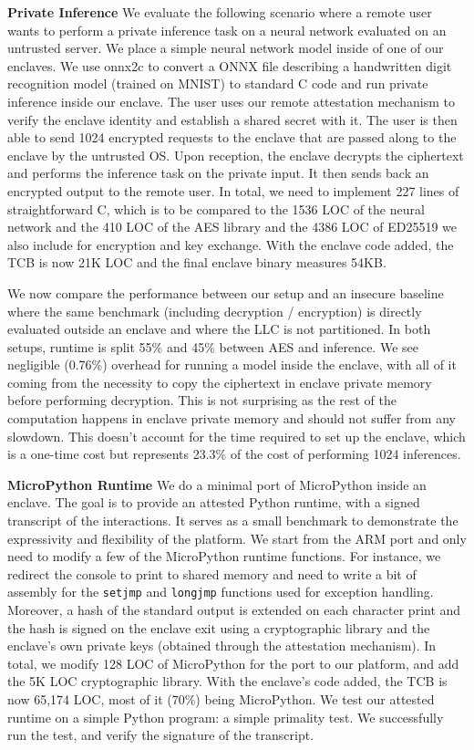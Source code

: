 \noindent\textbf{Private Inference}
\label{sec:evalprivateinference}
We evaluate the following scenario where a remote user wants to perform a private inference task on a neural network evaluated on an untrusted server.
We place a simple neural network model inside of one of our enclaves.
We use onnx2c \cite{onnx2cgithub} to convert a ONNX file describing a handwritten digit recognition model (trained on MNIST) to standard C code and run private inference inside our enclave.
The user uses our remote attestation mechanism to verify the enclave identity and establish a shared secret with it.
The user is then able to send 1024 encrypted requests to the enclave that are passed along to the enclave by the untrusted OS.
Upon reception, the enclave decrypts the ciphertext and performs the inference task on the private input.
It then sends back an encrypted output to the remote user.
In total, we need to implement 227 lines of straightforward C, which is to be compared to the 1536 LOC of the neural network and the 410 LOC of the AES library and the 4386 LOC of ED25519 we also include
for encryption and key exchange.
With the enclave code added, the TCB is now 21K LOC and the final enclave binary measures 54KB.

We now compare the performance between our setup and an insecure baseline where the same benchmark (including decryption / encryption) is directly evaluated outside an enclave and where the LLC is not partitioned.
In both setups, runtime is split 55\% and 45\% between AES and inference.
We see negligible (0.76\%) overhead for running a model inside the enclave, with all of it coming from the necessity to copy the ciphertext in enclave private memory before performing decryption.
This is not surprising as the rest of the computation happens in enclave private memory and should not suffer from any slowdown.
This doesn't account for the time required to set up the enclave, which is a one-time cost but represents 23.3\% of the cost of performing 1024 inferences.

\noindent\textbf{MicroPython Runtime}
\label{sec:evalmicropython}
We do a minimal port of MicroPython \cite{microphython} inside an enclave.
The goal is to provide an attested Python runtime, with a signed transcript of the interactions.
It serves as a small benchmark to demonstrate the expressivity and flexibility of the platform.
We start from the ARM port and only need to modify a few of the MicroPython runtime functions.
For instance, we redirect the console to print to shared memory and need to write a bit of assembly for the \texttt{setjmp} and \texttt{longjmp} functions used for exception handling.
Moreover, a hash of the standard output is extended on each character print and the hash is signed on the enclave exit using a cryptographic library and the enclave's own private keys (obtained through the attestation mechanism).
In total, we modify 128 LOC of MicroPython for the port to our platform, and add the 5K LOC cryptographic library. 
With the enclave's code added, the TCB is now 65,174 LOC, most of it (70\%) being MicroPython.
We test our attested runtime on a simple Python program: a simple primality test.
We successfully run the test, and verify the signature of the transcript.

